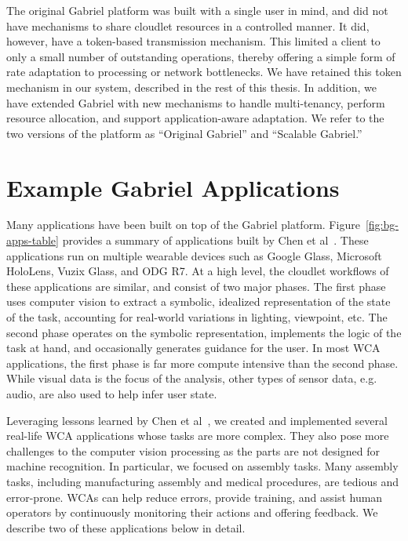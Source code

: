 The original Gabriel platform was built with a single user in mind, and did not
have mechanisms to share cloudlet resources in a controlled manner.  It did,
however, have a token-based transmission mechanism.  This limited a client to
only a small number of outstanding operations, thereby offering a simple form of
rate adaptation to processing or network bottlenecks.  We have retained this
token mechanism in our system, described in the rest of this thesis. In
addition, we have extended Gabriel with new mechanisms to handle multi-tenancy,
perform resource allocation, and support application-aware adaptation.  We refer
to the two versions of the platform as ``Original Gabriel'' and ``Scalable
Gabriel.''

\section{Example Gabriel Applications}
\label{sec:example-apps}

Many applications have been built on top of the Gabriel platform.
Figure~\ref{fig:bg-apps-table} provides a summary of applications built by Chen
et al~\cite{chen2018application}. These applications run on multiple wearable
devices such as Google Glass, Microsoft HoloLens, Vuzix Glass, and ODG R7. At a
high level, the cloudlet workflows of these applications are similar, and
consist of two major phases. The first phase uses computer vision to extract a
symbolic, idealized representation of the state of the task, accounting for
real-world variations in lighting, viewpoint, etc.  The second phase operates on
the symbolic representation, implements the logic of the task at hand, and
occasionally generates guidance for the user.  In most WCA applications, the
first phase is far more compute intensive than the second phase. While visual
data is the focus of the analysis, other types of sensor data, e.g. audio, are
also used to help infer user state.

Leveraging lessons learned by Chen et al~\cite{chen2018application}, we created
and implemented several real-life WCA applications whose tasks are more complex.
They also pose more challenges to the computer vision processing as the parts
are not designed for machine recognition. In particular, we focused on assembly
tasks. Many assembly tasks, including manufacturing assembly and medical
procedures, are tedious and error-prone. WCAs can help reduce errors, provide
training, and assist human operators by continuously monitoring their actions and
offering feedback. We describe two of these applications below in detail.

